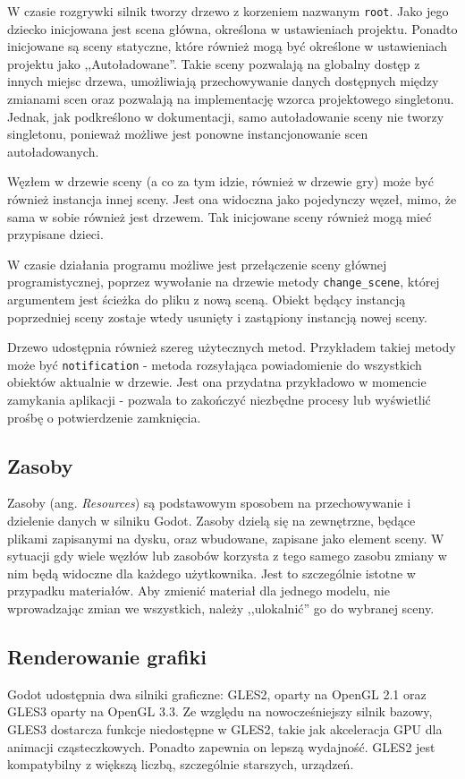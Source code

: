 W czasie rozgrywki silnik tworzy drzewo z korzeniem nazwanym \texttt{root}. Jako jego dziecko inicjowana jest scena główna, określona w ustawieniach projektu. Ponadto inicjowane są sceny statyczne, które również mogą być określone w ustawieniach projektu jako ,,Autoładowane''. Takie sceny pozwalają na globalny dostęp z innych miejsc drzewa, umożliwiają przechowywanie danych dostępnych między zmianami scen oraz pozwalają na implementację wzorca projektowego singletonu\cite{singleton_refactoring_guru}. Jednak, jak podkreślono w dokumentacji, samo autoładowanie sceny nie tworzy singletonu, ponieważ możliwe jest ponowne instancjonowanie scen autoładowanych. 

Węzłem w drzewie sceny (a co za tym idzie, również w drzewie gry) może być również instancja innej sceny. Jest ona widoczna jako pojedynczy węzeł, mimo, że sama w sobie również jest drzewem. Tak inicjowane sceny również mogą mieć przypisane dzieci.

W czasie działania programu możliwe jest przełączenie sceny głównej programistycznej, poprzez wywołanie na drzewie metody \texttt{change\_scene}, której argumentem jest ścieżka do pliku z nową sceną. Obiekt będący instancją poprzedniej sceny zostaje wtedy usunięty i zastąpiony instancją nowej sceny.

Drzewo udostępnia również szereg użytecznych metod. Przykładem takiej metody może być \texttt{notification} - metoda rozsyłająca powiadomienie do wszystkich obiektów aktualnie w drzewie. Jest ona przydatna przykładowo w momencie zamykania aplikacji - pozwala to zakończyć niezbędne procesy lub wyświetlić prośbę o potwierdzenie zamknięcia.

\subsection{Zasoby}
Zasoby (ang. \emph{Resources}) są podstawowym sposobem na przechowywanie i dzielenie danych w silniku Godot. Zasoby dzielą się na zewnętrzne, będące plikami zapisanymi na dysku, oraz wbudowane, zapisane jako element sceny. W sytuacji gdy wiele węzłów lub zasobów korzysta z tego samego zasobu zmiany w nim będą widoczne dla każdego użytkownika. Jest to szczególnie istotne w przypadku materiałów. Aby zmienić materiał dla jednego modelu, nie wprowadzając zmian we wszystkich, należy ,,ulokalnić'' go do wybranej sceny. 

\subsection{Renderowanie grafiki}
Godot udostępnia dwa silniki graficzne: GLES2, oparty na OpenGL 2.1 oraz GLES3 oparty na OpenGL 3.3. Ze względu na nowocześniejszy silnik bazowy, GLES3 dostarcza funkcje niedostępne w GLES2, takie jak akceleracja GPU dla animacji cząsteczkowych. Ponadto zapewnia on lepszą wydajność. GLES2 jest kompatybilny z większą liczbą, szczególnie starszych, urządzeń.

